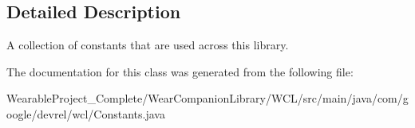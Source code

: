 \subsection{Detailed Description}
A collection of constants that are used across this library. 

The documentation for this class was generated from the following file\+:\begin{DoxyCompactItemize}
\item 
Wearable\+Project\+\_\+\+Complete/\+Wear\+Companion\+Library/\+W\+C\+L/src/main/java/com/google/devrel/wcl/Constants.\+java\end{DoxyCompactItemize}
